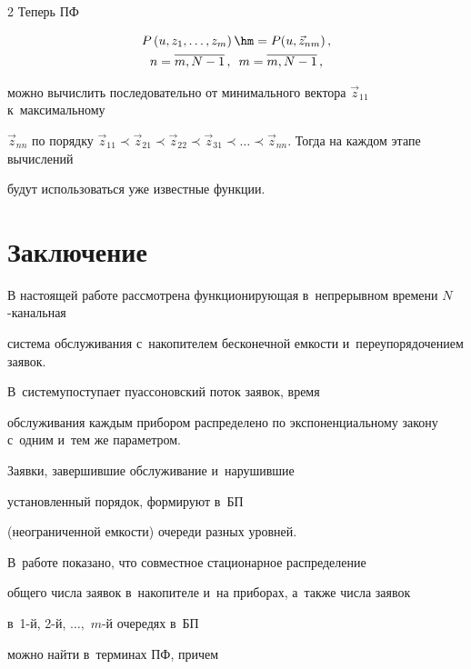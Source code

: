 \begin{multicols}{2}
Теперь ПФ 


\begin{multline*}


P\left(u,z_1,\ldots,z_{m}\right)\hm=P(u,{\vec z}_{nm})\,,\\


n=\overline{m,N-1}\,, 


\enskip


m=\overline{m,N-1}\,,


\end{multline*}


можно вычислить последовательно от минимального вектора ${\vec z}_{11}$ к~максимальному


${\vec z}_{nn}$ по порядку ${\vec z}_{11} \prec {\vec z}_{21} \prec {\vec z}_{22} 


\prec {\vec z}_{31} \prec \dots \prec {\vec z}_{nn}$. Тогда на каж\-дом этапе вычислений 


будут использоваться уже известные функции.





\section{Заключение}





В настоящей работе рассмотрена функционирующая в~непрерывном времени $N$-ка\-наль\-ная 


сис\-те\-ма обслуживания с~накопителем бесконечной емкости и~переупорядочением заявок.


В~систему\linebreak поступа\-ет пуассоновский поток заявок, время


обслуживания каждым прибором распределено по экспоненциальному закону с~одним и~тем же параметром.


Заявки, завершившие обслуживание и~нарушившие


установленный порядок, формируют в~БП


(неограниченной емкости) очереди разных уровней.


В~работе показано, что совместное стационарное распределение


общего числа заявок в~накопителе и~на приборах, а~также числа заявок


в~1-й, 2-й, $\ldots,$ $m$-й очередях в~БП


можно найти в~терминах ПФ, причем



\end{multicols}
